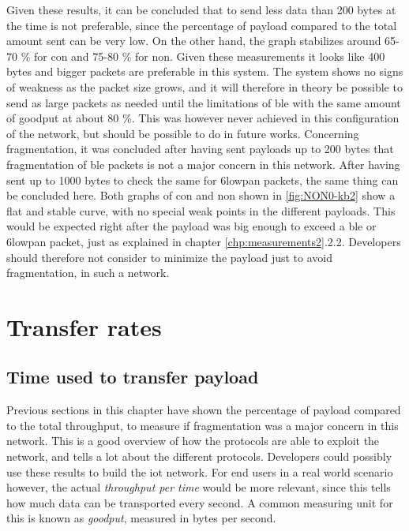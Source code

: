 \noindent Given these results, it can be concluded that to send less data than 200 bytes at the time is not preferable, since the percentage of \gls{payload} compared to the total amount sent can be very low. On the other hand, the graph stabilizes around 65-70 \% for \gls{con} and 75-80 \% for \gls{non}. Given these measurements it looks like 400 bytes and bigger packets are preferable in this system. The system shows no signs of weakness as the packet size grows, and it will therefore in theory be possible to send as large packets as needed until the limitations of \gls{ble} with the same amount of goodput at about 80 \%. This was however never achieved in this configuration of the network, but should be possible to do in future works. Concerning fragmentation, it was concluded after having sent \glspl{payload} up to 200 bytes that fragmentation of \gls{ble} packets is not a major concern in this network. After having sent up to 1000 bytes to check the same for \gls{6lowpan} packets, the same thing can be concluded here. Both graphs of \gls{con} and \gls{non} shown in \ref{fig:NON0-kb2} show a flat and stable curve, with no special weak points in the different \glspl{payload}. This would be expected right after the \gls{payload} was big enough to exceed a \gls{ble} or \gls{6lowpan} packet, just as explained in chapter \ref{chp:measurements2}.2.2. Developers should therefore not consider to minimize the \gls{payload} just to avoid fragmentation, in such a network. 




\section{Transfer rates}

\subsection{Time used to transfer payload}

\noindent Previous sections in this chapter have shown the percentage of payload compared to the total throughput, to measure if fragmentation was a major concern in this network. This is a good overview of how the protocols are able to exploit the network, and tells a lot about the different protocols. Developers could possibly use these results to build the \gls{iot} network. For end users in a real world scenario however, the actual \textit{throughput per time} would be more relevant, since this tells how much data can be transported every second. A common measuring unit for this is known as \textit{\gls{goodput}}, measured in bytes per second.  




